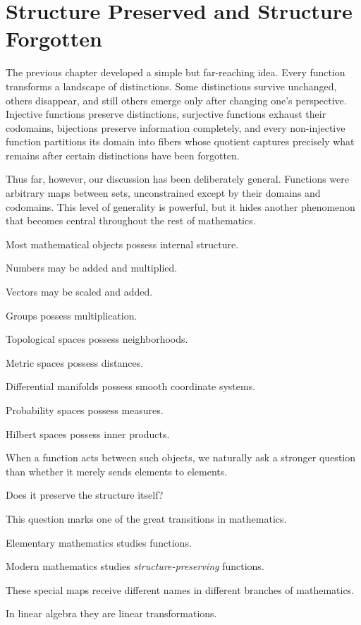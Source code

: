 \documentclass[11pt]{book}
\numberwithin{equation}{chapter}
\theoremstyle{definition}
\theoremstyle{plain}
\theoremstyle{remark}
\begin{document}
\chapter{Structure Preserved and Structure Forgotten}

The previous chapter developed a simple but far-reaching idea. Every function transforms a landscape of distinctions. Some distinctions survive unchanged, others disappear, and still others emerge only after changing one's perspective. Injective functions preserve distinctions, surjective functions exhaust their codomains, bijections preserve information completely, and every non-injective function partitions its domain into fibers whose quotient captures precisely what remains after certain distinctions have been forgotten.

Thus far, however, our discussion has been deliberately general. Functions were arbitrary maps between sets, unconstrained except by their domains and codomains. This level of generality is powerful, but it hides another phenomenon that becomes central throughout the rest of mathematics.

Most mathematical objects possess internal structure.

Numbers may be added and multiplied.

Vectors may be scaled and added.

Groups possess multiplication.

Topological spaces possess neighborhoods.

Metric spaces possess distances.

Differential manifolds possess smooth coordinate systems.

Probability spaces possess measures.

Hilbert spaces possess inner products.

When a function acts between such objects, we naturally ask a stronger question than whether it merely sends elements to elements.

Does it preserve the structure itself?

This question marks one of the great transitions in mathematics.

Elementary mathematics studies functions.

Modern mathematics studies \emph{structure-preserving} functions.

These special maps receive different names in different branches of mathematics.

In linear algebra they are linear transformations.
\end{document}

